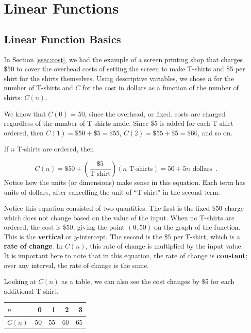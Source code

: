 \section{Linear Functions}
\label{sec:linear}


\subsection{Linear Function Basics}

In Section \ref{ssec:cost}, we had the example of a screen printing shop that charges \$50 to cover the overhead costs of setting the screen to make T-shirts and \$5 per shirt for the shirts themselves. Using descriptive variables, we chose $n$ for the number of T-shirts and $C$ for the cost in dollars as a function of the number of shirts: $C(n)$.

We know that $C(0)$ = 50, since the overhead, or fixed, costs are charged regardless of the number of T-shirts made. Since \$5 is added for each T-shirt ordered, then $C(1) = \$50 + \$5 = \$55$, $C(2) = \$55 + \$5 = \$60$, and so on.

If $n$ T-shirts are ordered, then

$$C(n) = \$50 + \left(\frac{\$5}{\mbox{T-shirt}}\right)(n \mbox{ T-shirts}) = 50 + 5n \mbox{ dollars} \enspace .$$
Notice how the units (or dimensions) make sense in this equation. Each term has units of dollars, after cancelling the unit of ``T-shirt" in the second term.

Notice this equation consisted of two quantities. The first is the fixed \$50 charge which does not change based on the value of the input. When no T-shirts are ordered, the cost is \$50, giving the point
$(0, 50)$ on the graph of the function. This is the {\bf vertical} or {$y$-intercept}. The second is the \$5 per T-shirt, which is a \textbf{rate of change}. In $C(n)$, this rate of change is multiplied by the input value. It is important here to note that in this equation, the rate of change is {\bf constant}; over any interval, the rate of change is the same.

Looking at $C(n)$ as a table, we can also see the cost changes by \$5 for each additional T-shirt.

\begin{table}[!ht]
\centering
\begin{tabular}{lrrrr}
\toprule
$n$    &  0 &  1 &  2 &  3 \\%
\midrule
$C(n)$ & 50 & 55 & 60 & 65 \\%
\bottomrule
\end{tabular}
\end{table}

